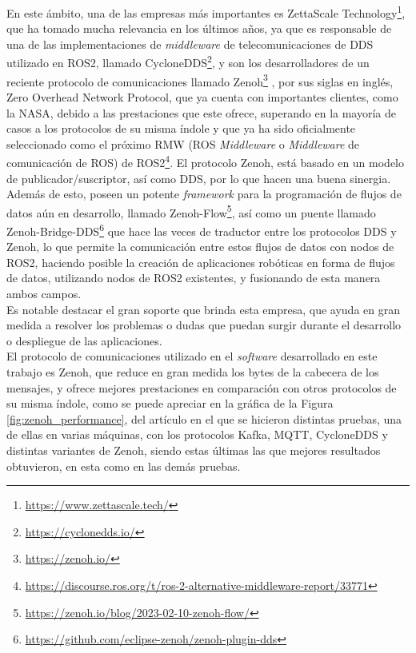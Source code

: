 En este ámbito, una de las empresas más importantes es ZettaScale
Technology\footnote{
\href{https://www.zettascale.tech/}{https://www.zettascale.tech/}}, que ha
tomado mucha relevancia en los últimos años, ya que es responsable de una de las
implementaciones de \textit{middleware} de telecomunicaciones de DDS utilizado
en ROS2, llamado CycloneDDS\footnote{
\href{https://cyclonedds.io/}{https://cyclonedds.io/}}, y son los
desarrolladores de un reciente protocolo de comunicaciones llamado
Zenoh\footnote{\href{https://zenoh.io/}{https://zenoh.io/}} \cite{zenoh}, por
sus siglas en inglés, Zero Overhead Network Protocol, que ya cuenta con
importantes clientes, como la NASA, debido a las prestaciones que este ofrece,
superando en la mayoría de casos a los protocolos de su misma índole y que ya ha
sido oficialmente seleccionado como el próximo RMW (ROS \textit{Middleware} o
\textit{Middleware} de comunicación de ROS) de ROS2\footnote{
\href{https://discourse.ros.org/t/ros-2-alternative-middleware-report/33771}{https://discourse.ros.org/t/ros-2-alternative-middleware-report/33771}}.
El protocolo Zenoh, está basado en un modelo de publicador/suscriptor, así como
DDS, por lo que hacen una buena sinergia.
\\

Además de esto, poseen un potente \textit{framework} para la programación de
flujos de datos aún en desarrollo, llamado
Zenoh-Flow\footnote{
\href{https://zenoh.io/blog/2023-02-10-zenoh-flow/}{https://zenoh.io/blog/2023-02-10-zenoh-flow/}},
\cite{zenohflow} así como un puente llamado Zenoh-Bridge-DDS\footnote{
\href{https://github.com/eclipse-zenoh/zenoh-plugin-dds}{https://github.com/eclipse-zenoh/zenoh-plugin-dds}}
que hace las veces de traductor entre los protocolos DDS y Zenoh, lo que permite
la comunicación entre estos flujos de datos con nodos de ROS2, haciendo posible
la creación de aplicaciones robóticas en forma de flujos de datos, utilizando
nodos de ROS2 existentes, y fusionando de esta manera ambos campos.
\\

Es notable destacar el gran soporte que brinda esta empresa, que ayuda en gran
medida a resolver los problemas o dudas que puedan surgir durante el desarrollo o
despliegue de las aplicaciones.
\\

El protocolo de comunicaciones utilizado en el \textit{software} desarrollado en
este trabajo es Zenoh, que reduce en gran medida los bytes de la cabecera de los
mensajes, y ofrece mejores prestaciones en comparación con otros protocolos de
su misma índole, como se puede apreciar en la gráfica de la Figura
\ref{fig:zenoh_performance}, del artículo \cite{liang2023zenoh_performance} en
el que se hicieron distintas pruebas, una de ellas en varias máquinas,
con los protocolos Kafka, MQTT, CycloneDDS y distintas variantes de Zenoh,
siendo estas últimas las que mejores resultados obtuvieron, en esta como en las
demás pruebas.
\\

